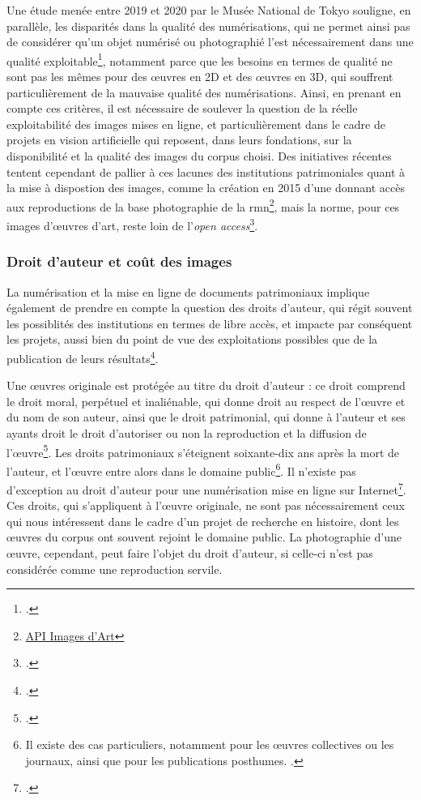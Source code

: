 Une étude menée entre 2019 et 2020 par le Musée National de Tokyo souligne, en parallèle, les disparités dans la qualité des numérisations, qui ne permet ainsi pas de considérer qu'un objet numérisé ou photographié l'est nécessairement dans une qualité exploitable\footcite{sakaiDigitizingDisparityMuseum2021}, notamment parce que les besoins en termes de qualité ne sont pas les mêmes pour des œuvres en 2D et des œuvres en 3D, qui souffrent particulièrement de la mauvaise qualité des numérisations. Ainsi, en prenant en compte ces critères, il est nécessaire de soulever la question de la réelle exploitabilité des images mises en ligne, et particulièrement dans le cadre de projets en vision artificielle qui reposent, dans leurs fondations, sur la disponibilité et la qualité des images du corpus choisi. Des initiatives récentes tentent cependant de pallier à ces lacunes des institutions patrimoniales quant à la mise à dispostion des images, comme la création en 2015 d'une \api donnant accès aux reproductions de la base photographie de la \acrshort{rmn}\footnote{\href{https://api.art.rmngp.fr/}{API
Images d'Art}}, mais la norme, pour ces images d'œuvres d'art, reste loin de l'\textit{open access}\footcite{mancaNouveauxDefisAgences2018}. 

        \subsubsection{Droit d'auteur et coût des images}
La numérisation et la mise en ligne de documents patrimoniaux implique également de prendre en compte la question des droits d'auteur, qui régit souvent les possiblités des institutions en termes de libre accès, et impacte par conséquent les projets, aussi bien du point de vue des exploitations possibles que de la publication de leurs résultats\footcite{jacquotDecrireTranscrireDiffuser2017}. 

Une œuvres originale est protégée au titre du droit d'auteur : ce droit comprend le droit moral, perpétuel et inaliénable, qui donne droit au respect de l'œuvre et du nom de son auteur, ainsi que le droit patrimonial, qui donne à l'auteur et ses ayants droit le droit d'autoriser ou non la reproduction et la diffusion de l'œuvre\footcite{sepetjanRespecterDroitPropriete2017}. Les droits patrimoniaux s'éteignent soixante-dix ans après la mort de l'auteur, et l'œuvre entre alors dans le domaine public\footnote{Il existe des cas particuliers, notamment pour les œuvres collectives ou les journaux, ainsi que pour les publications posthumes. \cite{institutnationaldhistoiredelartGuidePratiquePour}.}. Il n'existe pas d'exception au droit d'auteur pour une numérisation mise en ligne sur Internet\footcite{sepetjanRespecterDroitPropriete2017}. Ces droits, qui s'appliquent à l'œuvre originale, ne sont pas nécessairement ceux qui nous intéressent dans le cadre d'un projet de recherche en histoire, dont les œuvres du corpus ont souvent rejoint le domaine public. La photographie d'une œuvre, cependant, peut faire l'objet du droit d'auteur, si celle-ci n'est pas considérée comme une reproduction servile.

